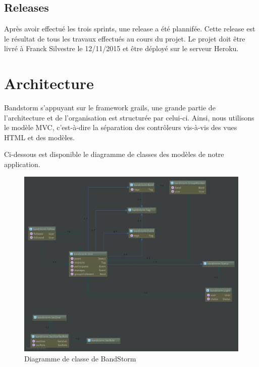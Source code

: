 \documentclass[12pt,a4paper,oneside]{book}
\begin{document}
	\section{Releases}
	Après avoir effectué les trois sprints, une release a été plannifée. Cette release est le résultat de tous les travaux
	effectués au cours du projet. Le projet doit être livré à Franck Silvestre le 12/11/2015 et être déployé sur le serveur Heroku.

	\chapter{Architecture}
	Bandstorm s'appuyant sur le framework grails, une grande partie de l'architecture et de l'organisation est structurée par
	celui-ci. Ainsi, nous utilisons le modèle MVC, c'est-à-dire la séparation des contrôleurs vis-à-vis des vues HTML et des
	modèles. 

	Ci-dessous est disponible le diagramme de classes des modèles de notre application.
	\begin{figure}[H]
		\hspace{-33px}
		\includegraphics[width=20cm]{classes.png}
		\caption{Diagramme de classe de BandStorm}
	\end{figure}
\end{document}
